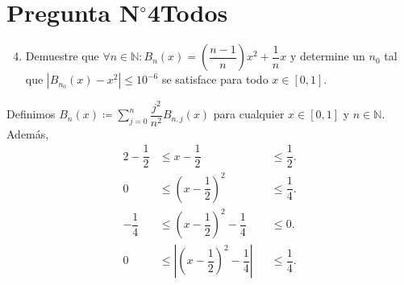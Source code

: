 \section{Pregunta N$^{\circ}$4\qquad Todos}



\begin{frame}
	\begin{enumerate}\setcounter{enumi}{3}
		\item

		      Demuestre que
		      \begin{math}
			      \forall n\in\mathbb{N}:
			      B_{n}\left(x\right)=
			      \left(\dfrac{n-1}{n}\right)x^{2}+
			      \dfrac{1}{n}x
		      \end{math}
		      y determine un $n_{0}$ tal que
		      \begin{math}
			      \left|
			      B_{n_{0}}\left(x\right)-
			      x^{2}
			      \right|\leq
			      10^{-6}
		      \end{math}
		      se satisface para todo $x\in\left[0,1\right]$.
	\end{enumerate}

	\begin{solution}
		Definimos
		\begin{math}
			B_{n}\left(x\right)\coloneqq
			\sum\limits_{j=0}^{n}
			\dfrac{j^{2}}{n^{2}}
			B_{n,j}\left(x\right)
		\end{math}
		para cualquier $x\in\left[0,1\right]$ y $n\in\mathbb{N}$.
		Además,
		\begin{alignat*}{2}
			-\dfrac{1}{2} & \leq x-\dfrac{1}{2}
			              &
			              & \leq \dfrac{1}{2}.                                               \\
			0             & \leq {\left(x-\dfrac{1}{2}\right)}^{2}
			              &
			              & \leq \dfrac{1}{4}.                                               \\
			-\dfrac{1}{4} & \leq {\left(x-\dfrac{1}{2}\right)}^{2}-\dfrac{1}{4}
			              &
			              & \leq 0.                                                          \\
			0             & \leq \left|{\left(x-\dfrac{1}{2}\right)}^{2}-\dfrac{1}{4}\right|
			              &
			              & \leq \dfrac{1}{4}.
		\end{alignat*}


\end{solution}
\end{frame}
